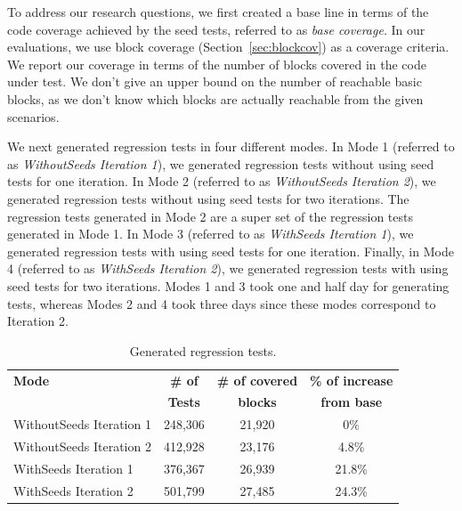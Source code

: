 To address our research questions, we first created a base line in terms of the code coverage achieved by the seed tests, referred to as \emph{base coverage}. In our evaluations, we use block coverage (Section~\ref{sec:blockcov}) as a coverage criteria. We report our coverage in terms of the number of blocks covered in the code under test. We don't give an upper bound on the number of reachable basic blocks, as we don't know which blocks are actually reachable from the given scenarios.

We next generated regression tests in four different modes. In Mode 1 (referred to as \emph{WithoutSeeds Iteration 1}), we generated regression tests without using seed tests for one iteration. In Mode 2 (referred to as \emph{WithoutSeeds Iteration 2}), we generated regression tests without using seed tests for two iterations. The regression tests generated in Mode 2 are a super set of the regression tests generated in Mode 1. In Mode 3 (referred to as \emph{WithSeeds Iteration 1}), we generated regression tests with using seed tests for one iteration. Finally, in Mode 4 (referred to as \emph{WithSeeds Iteration 2}), we generated regression tests with using seed tests for two iterations. Modes 1 and 3 took one and half day for generating tests, whereas Modes 2 and 4 took three days since these modes correspond to Iteration 2.

\setlength{\tabcolsep}{1pt}
\begin{table}[t]
\begin{SmallOut}
\begin{CodeOut}
\begin{center}
\begin {tabular} {|l|c|c|c|}
\hline
\textbf{Mode} & \textbf{\# of} & \textbf{\# of covered} & \textbf{\% of increase}\\  
 & \textbf{Tests} & \textbf{blocks} & \textbf{from base}\\  
\hline
\hline  WithoutSeeds Iteration 1 & 248,306 & 21,920 & 0\%\\
\hline  WithoutSeeds Iteration 2 & 412,928 & 23,176 & 4.8\%\\
\hline  WithSeeds Iteration 1 & 376,367 & 26,939 & 21.8\%\\
\hline  WithSeeds Iteration 2 & 501,799 & 27,485 & 24.3\%\\
\hline
\end{tabular}
\end{center}
\end{CodeOut}
\end{SmallOut}\vspace*{-4ex}
\centering \caption {\label{tab:gentests}Generated regression tests.}
\end{table}

